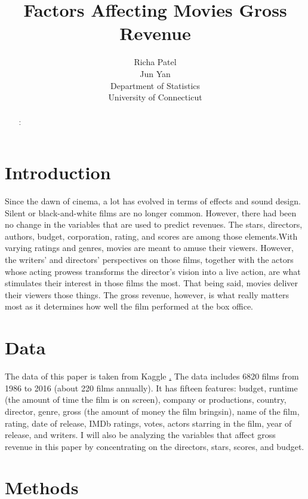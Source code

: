 \documentclass[12pt]{article}
\title{Factors Affecting Movies Gross Revenue}
\author{Richa Patel\\
  Jun Yan\\[2ex]
  Department of Statistics\\
  University of Connecticut\\
}
\begin{document}
\maketitle
\doublespace

\begin{abstract}


\bigskip
{}:
  

\end{abstract}


\section{Introduction}
\label{sec:intro}

Since the dawn of cinema, a lot has evolved in terms of effects and sound design. 
Silent or black-and-white films are no longer common. However, there had been no
change in the variables that are used to predict revenues. The stars, directors,
authors, budget, corporation, rating, and scores are among those elements.With 
varying ratings and genres, movies are meant to amuse their viewers. However, 
the writers' and directors' perspectives on those films, together with the actors 
whose acting prowess transforms the director's vision into a live action, are what 
stimulates their interest in those films the most. That being said, movies deliver 
their viewers those things. The gross revenue, however, is what really matters 
most as it determines how well the film performed at the box office.

\section{Data}
\label{sec:data}

The data of this paper is taken from Kaggle \href{https://www.kaggle.com/datasets/danielgrijalvas/movies}. 
The data includes 6820 films from 1986 to 2016 (about 220 films annually). It has
fifteen features: budget, runtime (the amount of time the film is on screen), company 
or productions, country, director, genre, gross (the amount of money the film bringsin), 
name of the film, rating, date of release, IMDb ratings, votes, actors starring in the
film, year of release, and writers. I will also be analyzing the variables that affect
gross revenue in this paper by concentrating on the directors, stars, scores, and budget.

\section{Methods}
\label{sec:meth}
\end{document}
